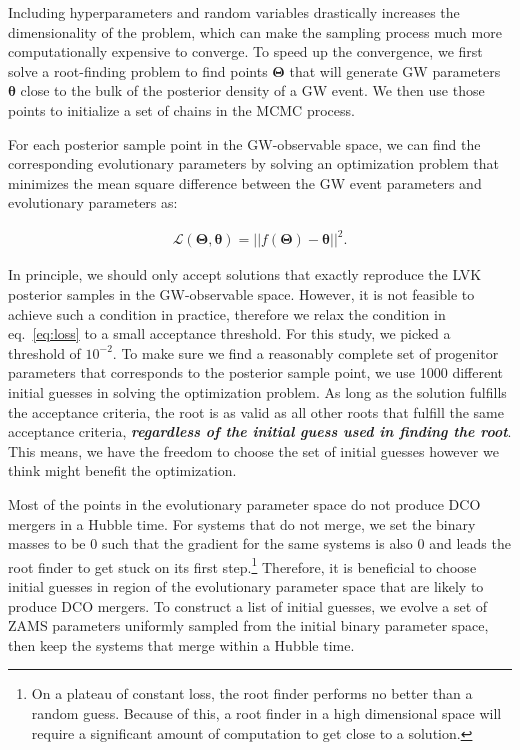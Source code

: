 \documentclass[twocolumn]{aastex631}
\begin{document}
Including hyperparameters and random variables %
drastically increases the dimensionality of the problem, which can make the
sampling process much more computationally expensive to converge. To speed up
the convergence, we first solve a root-finding problem to find points
$\bm{\Theta}$ that will generate GW parameters $\bm{\theta}$ close to the bulk
of the posterior density of a GW event.  We then use those points to initialize
a set of chains in the MCMC process.

For each posterior sample point in the GW-observable space,
we can find the corresponding evolutionary parameters by solving an optimization problem that minimizes
the mean square difference between the GW event parameters and evolutionary parameters as:

\begin{align}
\mathcal{L}(\bm{\Theta},\bm{\theta}) = ||f(\bm{\Theta})-\bm{\theta}||^2.
\label{eq:loss}
\end{align}

In principle, we should only accept solutions that exactly reproduce the LVK posterior samples in the GW-observable space.
However, it is not feasible to achieve such a condition in practice, therefore we relax the condition in eq.~\ref{eq:loss}
to a small acceptance threshold. For this study, we picked a threshold of $10^{-2}$. To make sure we find a reasonably
complete set of progenitor parameters that corresponds to the posterior sample point, we use 1000 different initial guesses
in solving the optimization problem. As long as the solution fulfills the acceptance criteria, the root is as valid as all
other roots that fulfill the same acceptance criteria, \textbf{\emph{regardless of the initial guess used in finding the root}}.
This means, we have the freedom to choose the set of initial guesses however we think might benefit the optimization.

Most of the points in the evolutionary parameter space do not produce DCO mergers in a Hubble time. For systems that do not merge,
we set the binary masses to be $0$ such that the gradient for the same systems is also $0$ and leads the root finder to get stuck on
its first step.{\footnote{On a plateau of constant loss, the root finder performs no better than a random guess.
Because of this, a root finder in a high dimensional space will require a significant amount of computation
to get close to a solution.}} Therefore, it is beneficial to choose initial guesses in region of the evolutionary parameter
space that are likely to produce DCO mergers. To construct a list of initial guesses, we evolve a set of
ZAMS parameters uniformly sampled from the initial binary parameter space, then keep the systems that
merge within a Hubble time.
\end{document}
